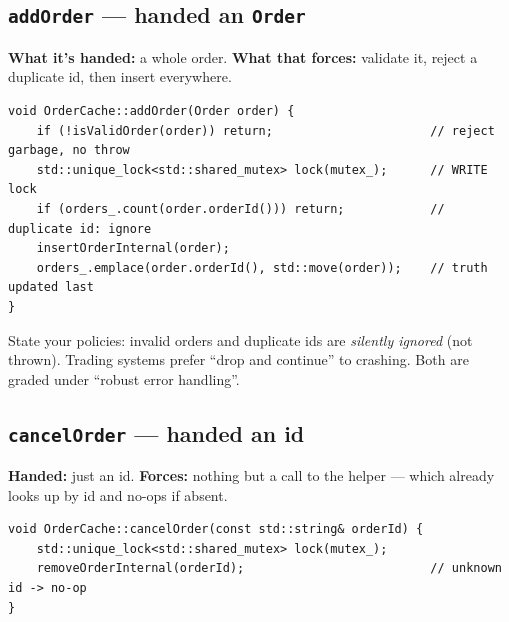 \subsection{\texttt{addOrder} --- handed an \texttt{Order}}

\textbf{What it's handed:} a whole order. \textbf{What that forces:} validate it,
reject a duplicate id, then insert everywhere.

\begin{center}
\end{center}

\begin{lstlisting}
void OrderCache::addOrder(Order order) {
    if (!isValidOrder(order)) return;                      // reject garbage, no throw
    std::unique_lock<std::shared_mutex> lock(mutex_);      // WRITE lock
    if (orders_.count(order.orderId())) return;            // duplicate id: ignore
    insertOrderInternal(order);
    orders_.emplace(order.orderId(), std::move(order));    // truth updated last
}
\end{lstlisting}

\begin{pitfall}
State your policies: invalid orders and duplicate ids are \emph{silently ignored}
(not thrown). Trading systems prefer ``drop and continue'' to crashing. Both are
graded under ``robust error handling''.
\end{pitfall}

\subsection{\texttt{cancelOrder} --- handed an id}

\textbf{Handed:} just an id. \textbf{Forces:} nothing but a call to the helper ---
which already looks up by id and no-ops if absent.

\begin{lstlisting}
void OrderCache::cancelOrder(const std::string& orderId) {
    std::unique_lock<std::shared_mutex> lock(mutex_);
    removeOrderInternal(orderId);                          // unknown id -> no-op
}
\end{lstlisting}

